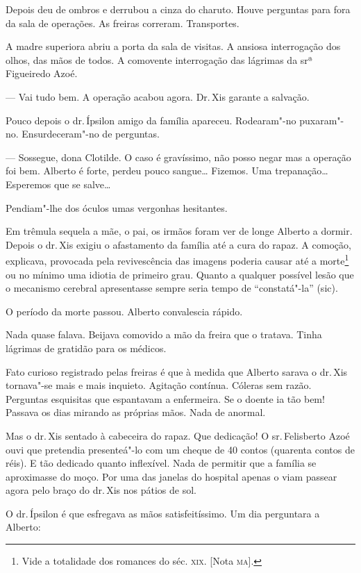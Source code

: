 Depois deu de ombros e derrubou a cinza do charuto. Houve perguntas para
fora da sala de operações. As freiras correram. Transportes.

A madre superiora abriu a porta da sala de visitas. A ansiosa
interrogação dos olhos, das mãos de todos. A comovente interrogação das
lágrimas da srª Figueiredo Azoé.

--- Vai tudo bem. A operação acabou agora. Dr.\,Xis garante a salvação.

Pouco depois o dr.\,Ípsilon amigo da família apareceu. Rodearam"-no
puxaram"-no. Ensurdeceram"-no de perguntas.

--- Sossegue, dona Clotilde. O caso é gravíssimo, não posso negar mas a
operação foi bem. Alberto é forte, perdeu pouco sangue\ldots{} Fizemos. Uma
trepanação\ldots{} Esperemos que se salve\ldots{}

Pendiam"-lhe dos óculos umas vergonhas hesitantes.

Em trêmula sequela a mãe, o pai, os irmãos foram ver de longe Alberto a
dormir. Depois o dr.\,Xis exigiu o afastamento da família até a cura do
rapaz. A comoção, explicava, provocada pela revivescência das imagens
poderia causar até a morte\footnote{Vide a totalidade dos romances do
  séc. \textsc{xix}. {[}Nota \textsc{ma}{]}.} ou no mínimo uma idiotia de primeiro grau.
Quanto a qualquer possível lesão que o mecanismo cerebral apresentasse
sempre seria tempo de ``constatá"-la'' (sic).

O período da morte passou. Alberto convalescia rápido.

Nada quase falava. Beijava comovido a mão da freira que o tratava. Tinha
lágrimas de gratidão para os médicos.

Fato curioso registrado pelas freiras é que à medida que Alberto sarava
o dr.\,Xis tornava"-se mais e mais inquieto. Agitação contínua. Cóleras
sem razão. Perguntas esquisitas que espantavam a enfermeira. Se o doente
ia tão bem! Passava os dias mirando as próprias mãos. Nada de anormal.

Mas o dr.\,Xis sentado à cabeceira do rapaz. Que dedicação! O sr.\,Felisberto Azoé ouvi que pretendia presenteá"-lo com um cheque de 40
contos (quarenta contos de réis). E tão dedicado quanto inflexível. Nada
de permitir que a família se aproximasse do moço. Por uma das janelas do
hospital apenas o viam passear agora pelo braço do dr.\,Xis nos pátios de
sol.

O dr.\,Ípsilon é que esfregava as mãos satisfeitíssimo. Um dia perguntara
a Alberto:

